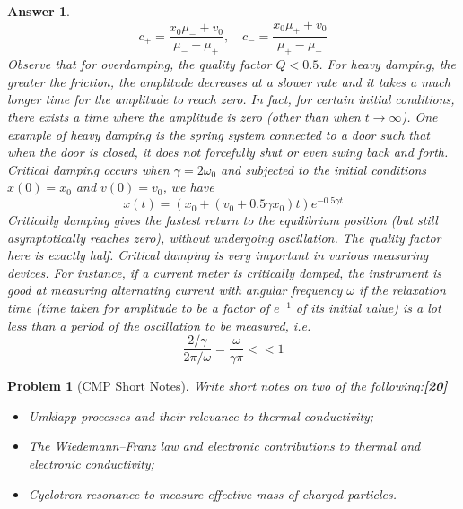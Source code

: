 \documentclass[a4paper]{article}
\newtheorem{ans}{Answer}[subsection]
\theoremstyle{new}
\newtheorem{qns}{Problem}[subsection]
\begin{document}
\begin{ans}
$$c_+=\frac{x_0\mu_-+v_0}{\mu_--\mu_+},\quad c_-=\frac{x_0\mu_++v_0}{\mu_+-\mu_-}$$
Observe that for overdamping, the quality factor $Q<0.5$. For heavy damping, the greater the friction, the amplitude decreases at a slower rate and it takes a much longer time for the amplitude to reach zero. In fact, for certain initial conditions, there exists a time where the amplitude is zero (other than when $t\rightarrow\infty$). One example of heavy damping is the spring system connected to a door such that when the door is closed, it does not forcefully shut or even swing back and forth.\\[5pt]
Critical damping occurs when $\gamma=2\omega_0$ and subjected to the initial conditions $x(0)=x_0$ and $v(0)=v_0$, we have
$$x(t)=(x_0+(v_0+0.5\gamma x_0)t)e^{-0.5\gamma t}$$
Critically damping gives the fastest return to the equilibrium position (but still asymptotically reaches zero), without undergoing oscillation. The quality factor here is exactly half. Critical damping is very important in various measuring devices. For instance, if a current meter is critically damped, the instrument is good at measuring alternating current with angular frequency $\omega$ if the relaxation time (time taken for amplitude to be a factor of $e^{-1}$ of its initial value) is a lot less
than a period of the oscillation to be measured, i.e.
$$\frac{2/\gamma}{2\pi/\omega}=\frac{\omega}{\gamma\pi}<<1$$
\end{ans}
\newpage
\begin{qns}[CMP Short Notes]
Write short notes on two of the following:\hfill\textbf{[20]}
\begin{itemize}
    \item Umklapp processes and their relevance to thermal conductivity;
    \item The Wiedemann–Franz law and electronic contributions to thermal and electronic conductivity;
    \item Cyclotron resonance to measure effective mass of charged particles.
\end{itemize}
\end{qns}
\end{document}
